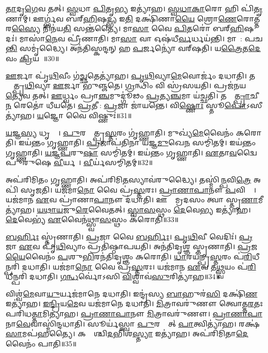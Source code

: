 \ul{𑌤𑌾}𑌦𑍃\ul{𑌗𑍇}𑌵 𑌤𑌤𑍍।
\ul{𑌸𑍍𑌵}𑌧𑌾 \ul{𑌪𑌿}𑌤𑍃\ul{𑌭𑍍𑌯} 𑌇𑌤𑍍𑌯𑌾॑𑌹।
\ul{𑌸𑍍𑌵}\ul{𑌧𑌾}\ul{𑌕𑌾}𑌰𑍋 𑌹𑌿 𑌪𑌿॑\ul{𑌤𑍃}𑌣𑌾𑌮𑍍।
𑌊𑌰𑍍𑌗𑍍𑌭॑𑌵 𑌬𑌰𑍍‌\mbox{}\ul{𑌹𑌿}𑌷\ul{𑌦𑍍𑌭𑍍𑌯} 𑌇\ul{𑌤𑌿} 𑌦𑌕𑍍𑌷𑌿॑𑌣𑌾\ul{𑌯𑍈} 𑌶𑍍𑌰𑍋\ul{𑌣𑍇}𑌰𑍋𑌤𑍍𑌤॑𑌰\ul{𑌸𑍍𑌯𑍈} 𑌨𑌿𑌨॑𑌯\ul{𑌤𑌿} 𑌸𑌨𑍍𑌤॑𑌤𑍍𑌯𑍈।
𑌮𑌾\ul{𑌸𑌾} 𑌵𑍈 \ul{𑌪𑌿}𑌤𑌰𑍋॑ 𑌬𑌰𑍍‌\mbox{}\ul{𑌹𑌿}𑌷𑌦𑌃॑।
𑌮𑌾𑌸𑌾॑\ul{𑌨𑍇}𑌵 𑌪𑍍𑌰𑍀॑𑌣𑌾𑌤𑌿।
𑌮𑌾\ul{𑌸𑌾} 𑌵𑌾 𑌓𑌷॑𑌧𑍀\ul{𑌰𑍍𑌵}𑌰𑍍𑌧𑌯॑𑌨𑍍𑌤𑌿।
𑌮𑌾𑌸𑌾᳚: 𑌪𑌚\ul{𑌨𑍍𑌤𑌿} 𑌸𑌮𑍃॑𑌦𑍍𑌧𑍍𑌯𑍈।
𑌅𑌨॑𑌤𑌿𑌸𑍍𑌕𑌨𑍍𑌦𑌨𑍍 𑌹 \ul{𑌪}𑌰𑍍𑌜𑌨𑍍𑌯𑍋॑ 𑌵𑌰𑍍‌\mbox{}𑌷𑌤𑌿।
𑌯\ul{𑌤𑍍𑌰𑍈}𑌤\ul{𑌦𑍇}𑌵𑌂 \ul{𑌕𑍍𑌰𑌿}𑌯𑌤𑍇᳚॥30॥

\ul{𑌊}𑌰𑍍𑌜𑌾 𑌪𑍃॑\ul{𑌥𑌿}𑌵𑍀𑌂 𑌗॑\ul{𑌚𑍍𑌛}𑌤𑍇𑌤𑍍𑌯𑌾॑𑌹।
\ul{𑌪𑍃}\ul{𑌥𑌿}𑌵𑍍𑌯𑌾\ul{𑌮𑍇}𑌵𑍋𑌰𑍍𑌜𑌂॑ 𑌦𑌧𑌾𑌤𑌿।
𑌤𑌸𑍍𑌮𑌾᳚𑌤𑍍𑌪𑍃\ul{𑌥𑌿}𑌵𑍍𑌯𑌾 \ul{𑌊}𑌰𑍍𑌜𑌾 𑌭𑍁॑𑌞𑍍𑌜𑌤𑍇।
\ul{𑌗𑍍𑌰}𑌨𑍍𑌥𑌿𑌂 𑌵𑌿 𑌸𑍍𑌰॑𑌸𑌯𑌤𑌿।
𑌪𑍍𑌰𑌜॑𑌨𑌯\ul{𑌤𑍍𑌯𑍇}𑌵 𑌤𑌤𑍍।
\ul{𑌊}𑌰𑍍𑌧𑍍𑌵𑌂 𑌪𑍍𑌰𑌾\ul{𑌞𑍍𑌚}𑌮𑍁𑌦𑍍𑌗𑍂॑𑌢𑌂 \ul{𑌪𑍍𑌰}𑌤𑍍𑌯\ul{𑌞𑍍𑌚}𑌮𑌾 𑌯॑𑌚𑍍𑌛𑌤𑌿।
𑌤𑌸𑍍𑌮𑌾᳚\ul{𑌤𑍍𑌪𑍍𑌰𑌾}𑌚𑍀\ul{𑌨}\ul{} 𑌰𑍇𑌤𑍋॑ 𑌧𑍀𑌯𑌤𑍇।
\ul{𑌪𑍍𑌰}𑌤𑍀𑌚𑍀᳚: \ul{𑌪𑍍𑌰}𑌜𑌾 𑌜𑌾॑𑌯𑌨𑍍𑌤𑍇।
𑌵𑌿\ul{𑌷𑍍𑌣𑍋𑌃} 𑌸𑍍𑌤𑍂\ul{𑌪𑍋}\-𑌽𑌸𑍀𑌤𑍍𑌯𑌾॑𑌹।
\ul{𑌯}𑌜𑍍𑌞𑍋 𑌵𑍈 𑌵𑌿𑌷𑍍𑌣𑍁𑌃॑॥31॥

\ul{𑌯}𑌜𑍍𑌞\ul{𑌸𑍍𑌯} 𑌧𑍃𑌤𑍍𑌯𑍈᳚।
\ul{𑌪𑍁}𑌰𑌸𑍍𑌤𑌾᳚𑌤𑍍𑌪𑍍𑌰\ul{𑌸𑍍𑌤}𑌰𑌂 𑌗𑍃॑𑌹𑍍𑌣𑌾𑌤𑌿।
𑌮𑍁𑌖𑍍𑌯॑\ul{𑌮𑍇}𑌵𑍈𑌨𑌂॑ 𑌕𑌰𑍋𑌤𑌿।
𑌇𑌯॑𑌨𑍍𑌤𑌂 𑌗𑍃𑌹𑍍𑌣𑌾𑌤𑌿।
\ul{𑌪𑍍𑌰}𑌜𑌾𑌪॑𑌤𑌿𑌨𑌾 𑌯𑌜𑍍𑌞\ul{𑌮𑍁}𑌖𑍇\ul{𑌨} 𑌸𑌮𑍍𑌮𑌿॑𑌤𑌮𑍍।
𑌇𑌯॑𑌨𑍍𑌤𑌂 𑌗𑍃𑌹𑍍𑌣𑌾𑌤𑌿।
\ul{𑌯}\ul{𑌜𑍍𑌞}\ul{𑌪}𑌰𑍁\ul{𑌷𑌾} 𑌸𑌮𑍍𑌮𑌿॑𑌤𑌮𑍍।
𑌇𑌯॑𑌨𑍍𑌤𑌂 𑌗𑍃𑌹𑍍𑌣𑌾𑌤𑌿।
\ul{𑌏}𑌤𑌾\ul{𑌵}𑌦𑍍𑌵𑍈 𑌪𑍁𑌰𑍁॑𑌷𑍇 \ul{𑌵𑍀}𑌰𑍍𑌯𑌮𑍍᳚।
\ul{𑌵𑍀}𑌰𑍍𑌯॑𑌸𑌮𑍍𑌮𑌿𑌤𑌮𑍍॥32॥

𑌅𑌪॑𑌰𑌿𑌮𑌿𑌤𑌂 𑌗𑍃𑌹𑍍𑌣𑌾𑌤𑌿।
𑌅𑌪॑𑌰𑌿𑌮𑌿\ul{𑌤}𑌸𑍍𑌯𑌾𑌵॑𑌰𑍁𑌦𑍍𑌧𑍍𑌯𑍈।
𑌤𑌸𑍍𑌮𑌿॑\ul{𑌨𑍍𑌪}𑌵𑌿\ul{𑌤𑍍𑌰𑍇} 𑌅𑌪𑌿॑ 𑌸𑍃𑌜𑌤𑌿।
𑌯𑌜॑𑌮𑌾\ul{𑌨𑍋} 𑌵𑍈 𑌪𑍍𑌰॑\ul{𑌸𑍍𑌤}𑌰𑌃।
\ul{𑌪𑍍𑌰𑌾}\ul{𑌣𑌾}\ul{𑌪𑌾}𑌨𑍗 \ul{𑌪}𑌵𑌿𑌤𑍍𑌰𑍇᳚।
𑌯𑌜॑𑌮𑌾𑌨 \ul{𑌏}𑌵 𑌪𑍍𑌰𑌾॑𑌣𑌾\ul{𑌪𑌾}𑌨𑍗 𑌦॑𑌧𑌾𑌤𑌿।
𑌊𑌰𑍍𑌣𑌾᳚𑌮𑍍𑌰𑌦𑌸𑌂 𑌤𑍍𑌵𑌾 𑌸𑍍𑌤𑍃\ul{𑌣𑌾}𑌮𑍀𑌤𑍍𑌯𑌾॑𑌹।
\ul{𑌯}\ul{𑌥𑌾}\ul{𑌯}𑌜𑍁\ul{𑌰𑍇}𑌵𑍈𑌤𑌤𑍍।
\ul{𑌸𑍍𑌵𑌾}\ul{𑌸}𑌸𑍍𑌥𑌂 \ul{𑌦𑍇}𑌵𑍇\ul{𑌭𑍍𑌯} 𑌇𑌤𑍍𑌯𑌾॑𑌹।
\ul{𑌦𑍇}𑌵𑍇𑌭𑍍𑌯॑ \ul{𑌏}𑌵𑍈𑌨॑𑌥𑍍𑌸𑍍𑌵𑌾\ul{𑌸}𑌸𑍍𑌥𑌂 𑌕॑𑌰𑍋𑌤𑌿॥33॥

\ul{𑌬}\ul{𑌰𑍍}𑌹𑌿𑌃 𑌸𑍍𑌤𑍃॑𑌣𑌾𑌤𑌿।
\ul{𑌪𑍍𑌰}𑌜𑌾 𑌵𑍈 \ul{𑌬}\ul{𑌰𑍍}𑌹𑌿𑌃।
\ul{𑌪𑍃}\ul{𑌥𑌿}𑌵𑍀 𑌵𑍇𑌦𑌿𑌃॑।
\ul{𑌪𑍍𑌰}𑌜𑌾 \ul{𑌏}𑌵 𑌪𑍃॑\ul{𑌥𑌿}𑌵𑍍𑌯𑌾𑌂 𑌪𑍍𑌰𑌤𑌿॑\-𑌷𑍍𑌠𑌾𑌪𑌯𑌤𑌿।
𑌅𑌨॑𑌤𑌿𑌦𑍃𑌶𑍍𑌞 𑌸𑍍𑌤𑍃𑌣𑌾𑌤𑌿।
\ul{𑌪𑍍𑌰}𑌜\ul{𑌯𑍈}𑌵𑍈𑌨𑌂॑ \ul{𑌪}𑌶𑍁\ul{𑌭𑌿}𑌰𑌨॑𑌤𑌿𑌦𑍃𑌶𑍍𑌞𑌂 𑌕𑌰𑍋𑌤𑌿।
\ul{𑌧𑌾}𑌰𑌯॑𑌨𑍍𑌪𑍍𑌰\ul{𑌸𑍍𑌤}𑌰𑌂 𑌪॑\ul{𑌰𑌿}𑌧𑍀𑌨𑍍𑌪𑌰𑌿॑ 𑌦𑌧𑌾𑌤𑌿।
𑌯𑌜॑𑌮𑌾\ul{𑌨𑍋} 𑌵𑍈 𑌪𑍍𑌰॑\ul{𑌸𑍍𑌤}𑌰𑌃।
𑌯𑌜॑𑌮𑌾𑌨 \ul{𑌏}𑌵 𑌤\ul{𑌥𑍍𑌸𑍍𑌵}𑌯𑌂 𑌪॑\ul{𑌰𑌿}𑌧𑍀𑌨𑍍𑌪𑌰𑌿॑ 𑌦𑌧𑌾𑌤𑌿।
\ul{𑌗}\ul{𑌨𑍍𑌧}𑌰𑍍𑌵𑍋॑𑌽𑌸𑌿 \ul{𑌵𑌿}𑌶𑍍𑌵𑌾𑌵॑\ul{𑌸𑍁}𑌰𑌿𑌤𑍍𑌯𑌾॑𑌹॥34॥

𑌵𑌿𑌶𑍍𑌵॑\ul{𑌮𑍇}𑌵𑌾\ul{𑌯𑍁}𑌰𑍍𑌯𑌜॑𑌮𑌾𑌨𑍇 𑌦𑌧𑌾𑌤𑌿।
𑌇𑌨𑍍𑌦𑍍𑌰॑𑌸𑍍𑌯 \ul{𑌬𑌾}𑌹𑍁𑌰॑\ul{𑌸𑌿} 𑌦𑌕𑍍𑌷𑌿॑\ul{𑌣} 𑌇𑌤𑍍𑌯𑌾॑𑌹।
\ul{𑌇}\ul{𑌨𑍍𑌦𑍍𑌰𑌿}𑌯\ul{𑌮𑍇}𑌵 𑌯𑌜॑𑌮𑌾𑌨𑍇 𑌦𑌧𑌾𑌤𑌿।
\ul{𑌮𑌿}𑌤𑍍𑌰𑌾𑌵𑌰𑍁॑𑌣𑍗 𑌤𑍍𑌵𑍋𑌤𑍍𑌤\ul{𑌰}𑌤𑌃 𑌪𑌰𑌿॑𑌧\ul{𑌤𑍍𑌤𑌾}𑌮𑌿𑌤𑍍𑌯𑌾॑𑌹।
\ul{𑌪𑍍𑌰𑌾}\ul{𑌣𑌾}\ul{𑌪𑌾}𑌨𑍗 \ul{𑌮𑌿}𑌤𑍍𑌰𑌾𑌵𑌰𑍁॑𑌣𑍗।
\ul{𑌪𑍍𑌰𑌾}\ul{𑌣𑌾}\ul{𑌪𑌾}𑌨𑌾\ul{𑌵𑍇}𑌵𑌾𑌸𑍍𑌮𑌿॑𑌨𑍍𑌦𑌧𑌾𑌤𑌿।
𑌸𑍂𑌰𑍍𑌯॑𑌸𑍍𑌤𑍍𑌵𑌾 \ul{𑌪𑍁}𑌰𑌸𑍍𑌤𑌾᳚𑌤𑍍 \ul{𑌪𑌾}𑌤𑍍𑌵𑌿𑌤𑍍𑌯𑌾॑𑌹।
𑌰𑌕𑍍𑌷॑\ul{𑌸𑌾}𑌮𑌪॑𑌹𑌤𑍍𑌯𑍈।
𑌕𑌸𑍍𑌯𑌾᳚𑌶𑍍𑌚𑌿\ul{𑌦}𑌭𑌿𑌶॑\ul{𑌸𑍍𑌤𑍍𑌯𑌾} 𑌇𑌤𑍍𑌯𑌾॑𑌹।
𑌅𑌪॑𑌰𑌿𑌮𑌿𑌤𑌾\ul{𑌦𑍇}𑌵𑍈𑌨𑌂॑ 𑌪𑌾𑌤𑌿॥35॥

